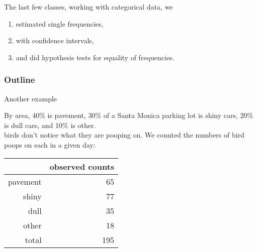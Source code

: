 %
%
%



\subtitle{$\chi^2$ between two samples}

\date{14 November 2013}






\begin{frame}
  \maketitle
\end{frame}


\begin{frame}{The last few classes,}
    working with \alert{categorical data}, we
  \begin{enumerate}
      \item estimated single frequencies,
      \item with confidence intervals,
      \item and did hypothesis tests for equality of frequencies.
  \end{enumerate}
\end{frame}

\begin{frame}\frametitle<presentation>{Outline}
  \tableofcontents
\end{frame}

\begin{frame}{Another example}

    By area, 
    40\% is pavement,
    30\% of a Santa Monica parking lot is shiny cars,
    20\% is dull cars,
    and 10\% is other.\\
     birds don't notice what they are pooping on.
    We counted the numbers of bird poops on each in a given day:
    \begin{center}
        \begin{tabular}{rr}
            & observed counts \\
            \hline 
            pavement & 65 \\
            shiny & 77 \\
            dull & 35 \\
            other & 18 \\
            \hline
            total & 195
        \end{tabular}
    \end{center}

\end{frame}



